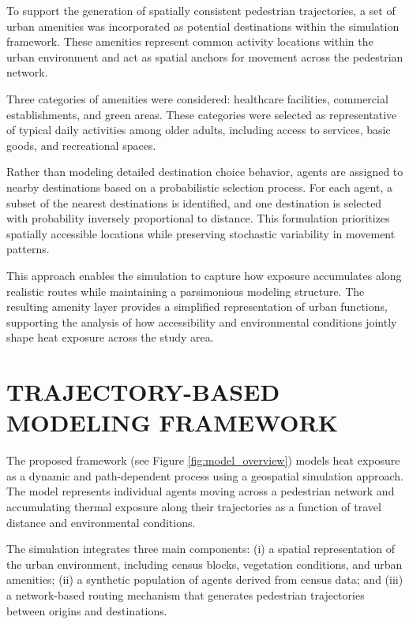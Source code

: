 \documentclass{wscpaperproc}
\theoremstyle{wsc}
\begin{document}
To support the generation of spatially consistent pedestrian trajectories, a set of urban amenities was incorporated as potential destinations within the simulation framework. These amenities represent common activity locations within the urban environment and act as spatial anchors for movement across the pedestrian network.

Three categories of amenities were considered: healthcare facilities, commercial establishments, and green areas. These categories were selected as representative of typical daily activities among older adults, including access to services, basic goods, and recreational spaces.

Rather than modeling detailed destination choice behavior, agents are assigned to nearby destinations based on a probabilistic selection process. For each agent, a subset of the nearest destinations is identified, and one destination is selected with probability inversely proportional to distance. This formulation prioritizes spatially accessible locations while preserving stochastic variability in movement patterns.

This approach enables the simulation to capture how exposure accumulates along realistic routes while maintaining a parsimonious modeling structure. The resulting amenity layer provides a simplified representation of urban functions, supporting the analysis of how accessibility and environmental conditions jointly shape heat exposure across the study area.


\section{TRAJECTORY-BASED MODELING FRAMEWORK}
\label{sec:methodology}


The proposed framework (see Figure \ref{fig:model_overview}) models heat exposure as a dynamic and path-dependent process using a geospatial simulation approach. The model represents individual agents moving across a pedestrian network and accumulating thermal exposure along their trajectories as a function of travel distance and environmental conditions.

The simulation integrates three main components: (i) a spatial representation of the urban environment, including census blocks, vegetation conditions, and urban amenities; (ii) a synthetic population of agents derived from census data; and (iii) a network-based routing mechanism that generates pedestrian trajectories between origins and destinations.
\end{document}

